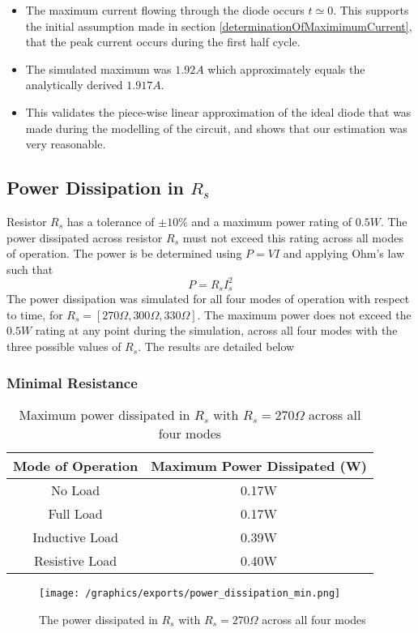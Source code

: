 \begin{itemize}
	\item The maximum current flowing through the diode occurs $t \simeq 0$. This supports the initial assumption made in section \ref{determinationOfMaximimumCurrent}, that the peak current occurs during the first half cycle.
	\item The simulated maximum was $1.92A$ which approximately equals the analytically derived $1.917A$. 
	\item This validates the piece-wise linear approximation of the ideal diode that was made during the modelling of the circuit, and shows that our estimation was very reasonable. 
\end{itemize}

\pagebreak
\subsection{Power Dissipation in $R_s$}
Resistor $R_s$ has a tolerance of $\pm 10\%$ and a maximum power rating of $0.5W$. The power dissipated across resistor $R_s$ must not exceed this rating across all modes of operation. The power is be determined using $P=VI$ and applying Ohm's law such that
\begin{equation}
	P=R_sI_s^2
\end{equation}
The power dissipation was simulated for all four modes of operation with respect to time, for $R_s = [270\Omega, 300\Omega, 330\Omega]$. The maximum power does not exceed the $0.5W$ rating at any point during the simulation, across all four modes with the three possible values of $R_s$.  The results are detailed below

\subsubsection{Minimal Resistance}
\begin{table}[H]
\centering
\begin{tabular}{|c|c|}\hline
	\textbf{Mode of Operation} & \textbf{Maximum Power Dissipated (W)} \\\hline
	No Load & 0.17W \\
	Full Load &  0.17W \\
	Inductive Load & 0.39W \\
	Resistive Load & 0.40W \\\hline
\end{tabular}
\caption{Maximum power dissipated in $R_s$ with $R_s = 270\Omega$ across all four modes}
\end{table}
\begin{figure}[H]
	\centering
	\texttt{[image: /graphics/exports/power\_dissipation\_min.png]}
	\caption{The power dissipated in $R_s$ with $R_s = 270\Omega$ across all four modes}
\end{figure}

